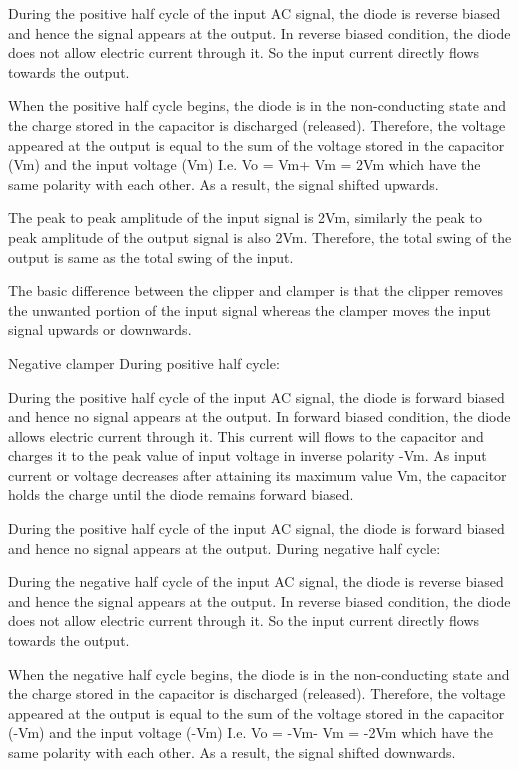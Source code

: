 \documentclass{article}
\begin{document}
During the positive half cycle of the input AC signal, the diode is reverse biased and hence the signal appears at the output. In reverse biased condition, the diode does not allow electric current through it. So the input current directly flows towards the output.


When the positive half cycle begins, the diode is in the non-conducting state and the charge stored in the capacitor is discharged (released). Therefore, the voltage appeared at the output is equal to the sum of the voltage stored in the capacitor (Vm) and the input voltage (Vm) { I.e. Vo = Vm+ Vm = 2Vm} which have the same polarity with each other. As a result, the signal shifted upwards.

The peak to peak amplitude of the input signal is 2Vm, similarly the peak to peak amplitude of the output signal is also 2Vm. Therefore, the total swing of the output is same as the total swing of the input.

The basic difference between the clipper and clamper is that the clipper removes the unwanted portion of the input signal whereas the clamper moves the input signal upwards or downwards.


Negative clamper
During positive half cycle:

During the positive half cycle of the input AC signal, the diode is forward biased and hence no signal appears at the output. In forward biased condition, the diode allows electric current through it. This current will flows to the capacitor and charges it to the peak value of input voltage in inverse polarity -Vm. As input current or voltage decreases after attaining its maximum value Vm, the capacitor holds the charge until the diode remains forward biased.

During the positive half cycle of the input AC signal, the diode is forward biased and hence no signal appears at the output. 
During negative half cycle:

During the negative half cycle of the input AC signal, the diode is reverse biased and hence the signal appears at the output. In reverse biased condition, the diode does not allow electric current through it. So the input current directly flows towards the output.

When the negative half cycle begins, the diode is in the non-conducting state and the charge stored in the capacitor is discharged (released). Therefore, the voltage appeared at the output is equal to the sum of the voltage stored in the capacitor (-Vm) and the input voltage (-Vm) {I.e. Vo = -Vm- Vm = -2Vm} which have the same polarity with each other. As a result, the signal shifted downwards.
\end{document}
